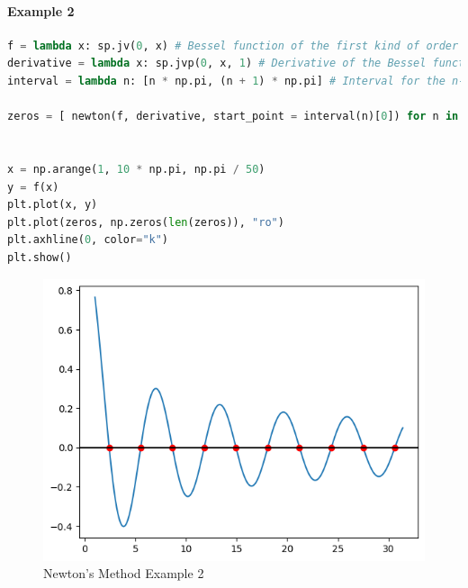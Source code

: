\paragraph{Example 2}{
\begin{lstlisting}[language=Python]
f = lambda x: sp.jv(0, x) # Bessel function of the first kind of order 0
derivative = lambda x: sp.jvp(0, x, 1) # Derivative of the Bessel function
interval = lambda n: [n * np.pi, (n + 1) * np.pi] # Interval for the n-th zero

zeros = [ newton(f, derivative, start_point = interval(n)[0]) for n in range(1, 11)]


x = np.arange(1, 10 * np.pi, np.pi / 50)
y = f(x)
plt.plot(x, y)
plt.plot(zeros, np.zeros(len(zeros)), "ro")
plt.axhline(0, color="k")
plt.show()
\end{lstlisting}
}
\begin{figure}[H]
    \centering
    \includegraphics{Include/Images/Thesis/Documentation/NonLinear/Newtons Example 2.png}
    \caption{Newton's Method Example 2}
    \label{fig:Newton's Method Example 2}
\end{figure}
